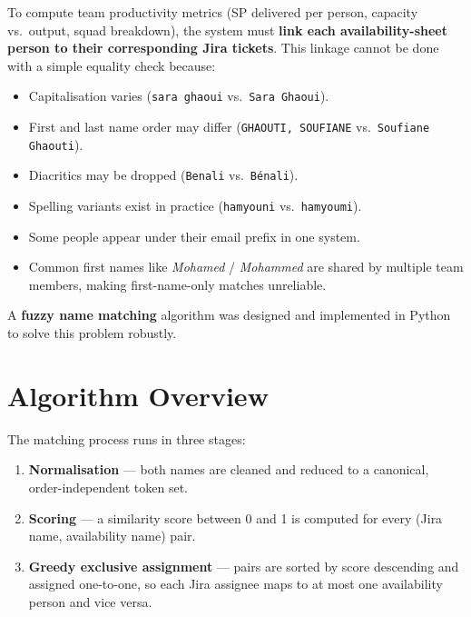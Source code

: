 \documentclass[12pt, a4paper]{article}
\begin{document}
To compute team productivity metrics (SP delivered per person, capacity vs.\ output, squad
breakdown), the system must \textbf{link each availability-sheet person to their
corresponding Jira tickets}. This linkage cannot be done with a simple equality check
because:

\begin{itemize}
    \item Capitalisation varies (\texttt{sara ghaoui} vs.\ \texttt{Sara Ghaoui}).
    \item First and last name order may differ (\texttt{GHAOUTI, SOUFIANE} vs.\
          \texttt{Soufiane Ghaouti}).
    \item Diacritics may be dropped (\texttt{Benali} vs.\ \texttt{Bénali}).
    \item Spelling variants exist in practice (\texttt{hamyouni} vs.\ \texttt{hamyoumi}).
    \item Some people appear under their email prefix in one system.
    \item Common first names like \textit{Mohamed} / \textit{Mohammed} are shared by
          multiple team members, making first-name-only matches unreliable.
\end{itemize}

A \textbf{fuzzy name matching} algorithm was designed and implemented in Python to solve
this problem robustly.

\section{Algorithm Overview}

The matching process runs in three stages:

\begin{enumerate}
    \item \textbf{Normalisation} — both names are cleaned and reduced to a canonical,
          order-independent token set.
    \item \textbf{Scoring} — a similarity score between 0 and 1 is computed for every
          (Jira name, availability name) pair.
    \item \textbf{Greedy exclusive assignment} — pairs are sorted by score descending and
          assigned one-to-one, so each Jira assignee maps to at most one availability
          person and vice versa.
\end{enumerate}

\vspace{0.8cm}
\end{document}
